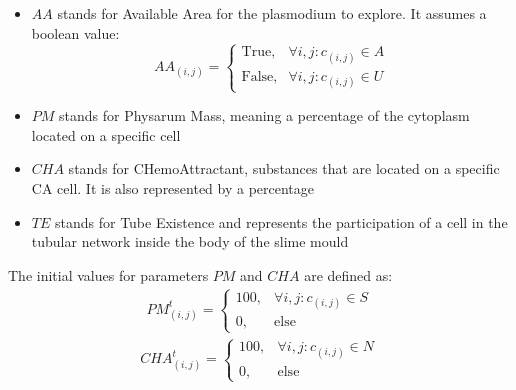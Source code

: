 \begin{itemize}
\item $AA$ stands for Available Area for the plasmodium to explore. It assumes a boolean value:  	
\[AA_{(i, j)}=\begin{cases} \mbox{True}, & \forall i, j: c_{(i,j)} \in A \\ \mbox{False}, &  \forall i, j: c_{(i,j)} \in U\end{cases}\]
\item $PM$ stands for Physarum Mass, meaning a percentage of the cytoplasm located on a specific cell
\item $CHA$ stands for CHemoAttractant, substances that are located on a specific CA cell. It is also represented by a percentage
\item $TE$ stands for Tube Existence and represents the participation of a cell in the tubular network inside the body of the slime mould
\end{itemize}

The initial values for parameters $PM$ and $CHA$ are defined as:
\begin{align}
PM^t_{(i, j)}=\begin{cases} 100, & \forall i, j: c_{(i,j)} \in S \\ 0, & \mbox{else}\end{cases}
\end{align}
\begin{align}
CHA^t_{(i, j)}=\begin{cases} 100, & \forall i, j: c_{(i,j)} \in N \\ 0, & \mbox{else}\end{cases}
\end{align}

